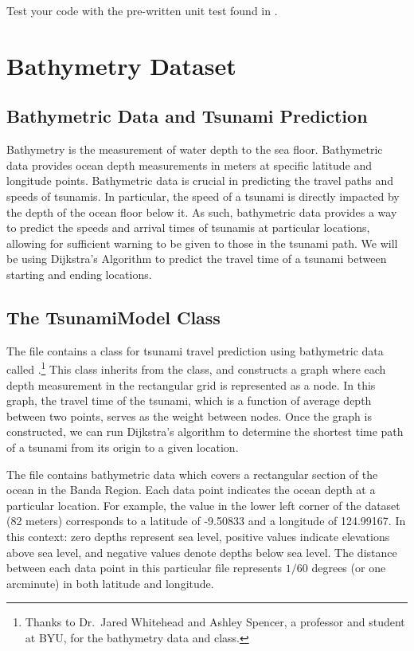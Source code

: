 \begin{unittest}
Test your code with the pre-written unit test found in .
\end{unittest}

\section*{Bathymetry Dataset} %

\subsection*{Bathymetric Data and Tsunami Prediction}
Bathymetry is the measurement of water depth to the sea floor.
Bathymetric data provides ocean depth measurements in meters at specific latitude and longitude points.
Bathymetric data is crucial in predicting the travel paths and speeds of tsunamis.
In particular, the speed of a tsunami is directly impacted by the depth of the ocean floor below it.
As such, bathymetric data provides a way to predict the speeds and arrival times of tsunamis at particular locations, allowing for sufficient warning to be given to those in the tsunami path.
We will be using Dijkstra's Algorithm to predict the travel time of a tsunami between starting and ending locations.


\subsection*{The TsunamiModel Class}

The file  contains a class for tsunami travel prediction using bathymetric data called .\footnote{Thanks to Dr.~Jared Whitehead and Ashley Spencer, a professor and student at BYU, for the bathymetry data and  class.}
This class inherits from the  class, and constructs a graph where each depth measurement in the rectangular grid is represented as a node.
In this graph, the travel time of the tsunami, which is a function of average depth between two points, serves as the weight between nodes.
Once the graph is constructed, we can run Dijkstra's algorithm to determine the shortest time path of a tsunami from its origin to a given location.

The file  contains bathymetric data which covers a rectangular section of the ocean in the Banda Region.
Each data point indicates the ocean depth at a particular location.
For example, the value in the lower left corner of the dataset (82 meters) corresponds to a latitude of -9.50833 and a longitude of 124.99167.
In this context: zero depths represent sea level, positive values indicate elevations above sea level, and negative values denote depths below sea level.
The distance between each data point in this particular file represents $1/60$ degrees (or one arcminute) in both latitude and longitude.

